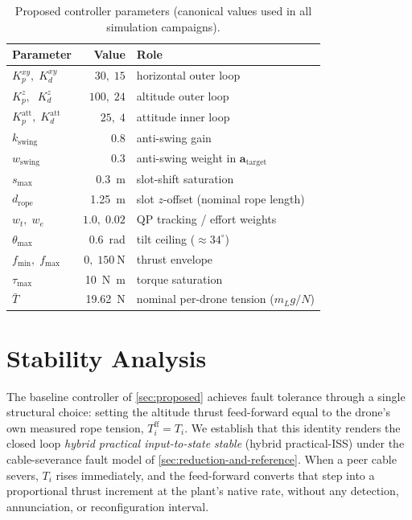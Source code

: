 \documentclass[lettersize,journal]{IEEEtran}
\newcommand{\vect}[1]{\boldsymbol{#1}}
\begin{document}
\begin{table}[t]
  \centering
  \caption{Proposed controller parameters (canonical values used
  in all simulation campaigns).}
  \label{tab:baseline-params}
  \small
  \renewcommand{\arraystretch}{1.05}
  \begin{tabular}{lrl}
    \toprule
    Parameter & Value & Role \\
    \midrule
    $K_p^{xy},\; K_d^{xy}$
      & $30,\;15$
      & horizontal outer loop \\
    $K_p^{z},\;\; K_d^{z}$
      & $100,\;24$
      & altitude outer loop \\
    $K_p^{\mathrm{att}},\; K_d^{\mathrm{att}}$
      & $25,\;4$
      & attitude inner loop \\
    $k_{\mathrm{swing}}$
      & $0.8$
      & anti-swing gain \\
    $w_{\mathrm{swing}}$
      & $0.3$
      & anti-swing weight in $\vect a_{\mathrm{target}}$ \\
    $s_{\max}$
      & \SI{0.3}{\metre}
      & slot-shift saturation \\
    $d_{\mathrm{rope}}$
      & \SI{1.25}{\metre}
      & slot $z$-offset (nominal rope length) \\
    $w_t,\; w_e$
      & $1.0,\;0.02$
      & QP tracking / effort weights \\
    $\theta_{\max}$
      & \SI{0.6}{\radian}
      & tilt ceiling (${\approx}34^{\circ}$) \\
    $f_{\min},\; f_{\max}$
      & $0,\;\SI{150}{\newton}$
      & thrust envelope \\
    $\tau_{\max}$
      & \SI{10}{\newton\metre}
      & torque saturation \\
    $\bar{T}$
      & \SI{19.62}{\newton}
      & nominal per-drone tension ($m_L g/N$) \\
    \bottomrule
  \end{tabular}
\end{table}

\section{Stability Analysis}
\label{sec:StabilityAnalysis}
\label{sec:stability}

The baseline controller of \cref{sec:proposed} achieves fault
tolerance through a single structural choice: setting the altitude
thrust feed-forward equal to the drone's own measured rope tension,
$T_i^{\mathrm{ff}} = T_i$. We establish that this identity renders
the closed loop \emph{hybrid practical input-to-state stable}
(hybrid practical-ISS) under the cable-severance fault model of
\cref{sec:reduction-and-reference}. When a peer cable severs,
$T_i$ rises immediately, and the feed-forward converts that step
into a proportional thrust increment at the plant's native rate,
without any detection, annunciation, or reconfiguration interval.
\end{document}
